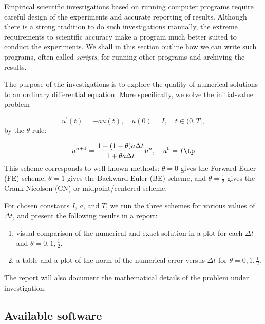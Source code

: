 \documentclass[graybox,sectrefs,envcountresetchap,open=right,final]{svmonodo}
\newenvironment{notice_mdfboxadmon}[1][]{
\begin{notice_mdfboxmdframed}[frametitle=#1]
}
{
\end{notice_mdfboxmdframed}
}
\begin{document}
Empirical scientific investigations based on running computer programs
require careful design of the experiments and accurate reporting of results.
Although there is a strong tradition to do such investigations manually,
the extreme requirements to scientific accuracy make a program much
better suited to conduct the experiments. We shall in this section outline
how we can write such programs, often called \emph{scripts}, for running other
programs and archiving the results.


\begin{notice_mdfboxadmon}
The purpose of the investigations is to explore the quality of numerical
solutions to an ordinary differential equation. More specifically, we
solve the initial-value problem

\begin{equation}
u^\prime(t) = -au(t),\quad u(0)=I,\quad t\in (0,T],
\label{softeng1:experiments:model}
\end{equation}
by the $\theta$-rule:

\begin{equation}
u^{n+1} = \frac{1 - (1-\theta) a\Delta t}{1 + \theta a\Delta t}u^n,
\quad u^0=I\tp
\label{softeng1:experiments:theta}
\end{equation}
This scheme corresponds to well-known methods: $\theta=0$ gives the
Forward Euler (FE) scheme, $\theta=1$ gives the Backward Euler (BE) scheme,
and $\theta=\frac{1}{2}$ gives the Crank-Nicolson
(CN) or midpoint/centered scheme.

For chosen constants $I$, $a$, and $T$, we run the three schemes for various
values of $\Delta t$, and present the following results in a report:

\begin{enumerate}
\item visual comparison of the numerical and exact solution in a plot for
   each $\Delta t$ and $\theta=0,1,\frac{1}{2}$,

\item a table and a plot of the norm of the numerical error versus $\Delta t$
   for $\theta=0,1,\frac{1}{2}$.
\end{enumerate}

\noindent
The report will also document the mathematical details of the problem under
investigation.
\end{notice_mdfboxadmon}



\subsection{Available software}
\end{document}
